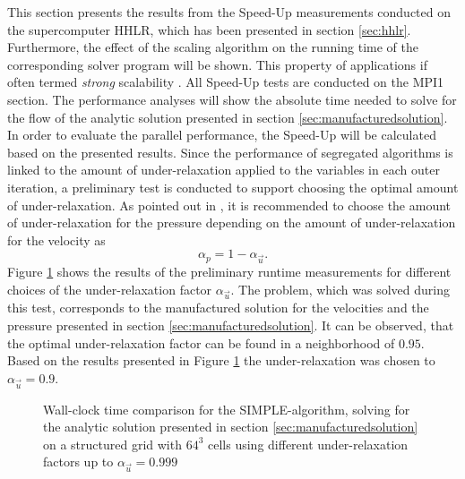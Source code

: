 This section presents the results from the Speed-Up measurements conducted on the supercomputer HHLR, which has been presented in section \ref{sec:hhlr}. Furthermore, the effect of the scaling algorithm on the running time of the corresponding solver program will be shown. This property of applications if often termed \emph{strong} scalability \cite{hager11}. All Speed-Up tests are conducted on the MPI1 section. The performance analyses will show the absolute time needed to solve for the flow of the analytic solution presented in section \ref{sec:manufacturedsolution}. In order to evaluate the parallel performance, the Speed-Up will be calculated based on the presented results. Since the performance of segregated algorithms is linked to the amount of under-relaxation applied to the variables in each outer iteration, a preliminary test is conducted to support choosing the optimal amount of under-relaxation. As pointed out in \cite{ferziger02,schaefer99}, it is recommended to choose the amount of under-relaxation for the pressure depending on the amount of under-relaxation for the velocity as
\begin{displaymath}
  \alpha_p = 1 - \alpha_{\vec{u}}.
\end{displaymath}
Figure \ref{fig:underrelax} shows the results of the preliminary runtime measurements for different choices of the under-relaxation factor \( \alpha_{\vec{u}} \). The problem, which was solved during this test, corresponds to the manufactured solution for the velocities and the pressure presented in section \ref{sec:manufacturedsolution}. It can be observed, that the optimal under-relaxation factor can be found in a neighborhood of \(0.95\). Based on the results presented in Figure \ref{fig:underrelax} the under-relaxation was chosen to \( \alpha_{\vec{u}} =0.9 \). 

\begin{figure}[h!]
  \centering
  \caption{Wall-clock time comparison for the SIMPLE-algorithm, solving for the analytic solution presented in section \ref{sec:manufacturedsolution} on a structured grid with $64^3$ cells using different under-relaxation factors up to $\alpha_\vec{u}=0.999$}
  \label{fig:underrelax}
\end{figure}

